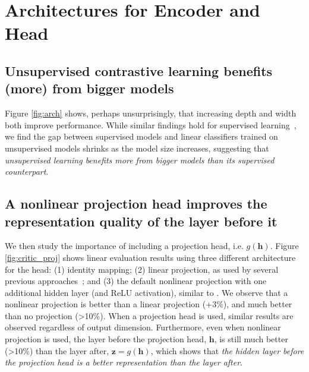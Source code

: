 \section{Architectures for Encoder and Head}
\label{sec:arch}

\subsection{Unsupervised contrastive learning benefits (more) from bigger models}


Figure \ref{fig:arch} shows, perhaps unsurprisingly, that increasing depth and width both improve performance. While similar findings hold for supervised learning~\cite{he2016deep}, we find the gap between supervised models and linear classifiers trained on unsupervised models shrinks as the model size increases, suggesting that \textit{unsupervised learning benefits more from bigger models than its supervised counterpart}.

\subsection{A nonlinear projection head improves the representation quality of the layer before it}

We then study the importance of including a projection head, i.e. $g(\bm h)$. Figure \ref{fig:critic_proj} shows linear evaluation results using three different architecture for the head: (1) identity mapping; (2) linear projection, as used by several previous approaches~\cite{wu2018unsupervised}; and (3) the default nonlinear projection with one additional hidden layer (and ReLU activation), similar to \citet{bachman2019learning}. We observe that a nonlinear projection is better than a linear projection (+3\%), and much better than no projection (>10\%). When a projection head is used, similar results are observed regardless of output dimension. Furthermore, even when nonlinear projection is used, the layer before the projection head, $\bm h$, is still much better (>10\%) than the layer after, $\bm z=g(\bm h)$, which shows that \textit{the hidden layer before the projection head is a better representation than the layer after}.

